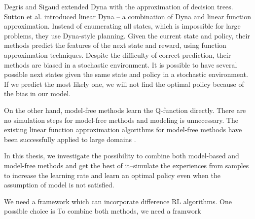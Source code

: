 

Degris and Sigaud \cite{ApproxTree} extended Dyna \cite{Dyna} with the approximation of decision trees.
Sutton et al. \cite{ApproxDyna} introduced linear Dyna -- a combination 
of Dyna and linear function approximation. 
Instead of enumerating all states, which is impossible for large problems, they
use Dyna-style planning. Given the current state and policy, 
their methods predict the features of the next state and reward, using function approximation
techniques. Despite the difficulty of correct prediction, their methods are biased 
in a stochastic environment. It is possible to have
several possible next states given the same state and policy in a stochastic environment.
If we predict the most likely one, we will not find the optimal policy because of the bias in our model.


On the other hand, model-free methods learn the Q-function directly. 
There are no simulation steps for model-free methods and modeling is unnecessary. 
The existing linear function approximation algorithms for model-free methods have been successfully 
applied to large domains \cite{LSTD99}\cite{KeepAway}. 






In this thesis, we investigate the possibility to combine both model-based and model-free methods 
and get the best of it--simulate the experiences from samples to increase the learning rate
and learn an optimal policy even when the assumption of model is not satisfied. 

We need a framework which can incorporate difference RL algorithms.
One possible choice is 
To combine both methods, we need a framwork 

